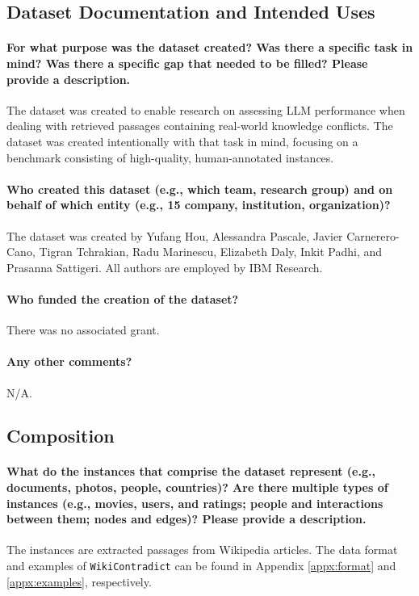 \documentclass{article}
\begin{document}
\subsection{Dataset Documentation and Intended Uses}
\paragraph{For what purpose was the dataset created? Was there a specific task in mind? Was there a specific gap that needed to be filled? Please provide a description.}
The dataset was created to enable research on assessing LLM performance when dealing with retrieved passages containing real-world knowledge conflicts. The dataset was created intentionally with that task in mind, focusing on a benchmark consisting of high-quality, human-annotated instances.

\paragraph{Who created this dataset (e.g., which team, research group) and on behalf of which entity (e.g.,
15 company, institution, organization)?} 
The dataset was created by Yufang Hou, Alessandra Pascale, Javier Carnerero-Cano, Tigran Tchrakian, Radu Marinescu, Elizabeth Daly, Inkit Padhi, and Prasanna Sattigeri. All authors are employed by IBM Research.

\paragraph{Who funded the creation of the dataset?}
There was no associated grant.

\paragraph{Any other comments?}
N/A.

\subsection{Composition}
\paragraph{What do the instances that comprise the dataset represent (e.g., documents, photos, people, countries)? Are there multiple types of instances (e.g., movies, users, and ratings; people and
interactions between them; nodes and edges)? Please provide a description.}
The instances are extracted passages from Wikipedia articles. The data format and examples of \texttt{WikiContradict} can be found in Appendix \ref{appx:format} and \ref{appx:examples}, respectively.
\end{document}
